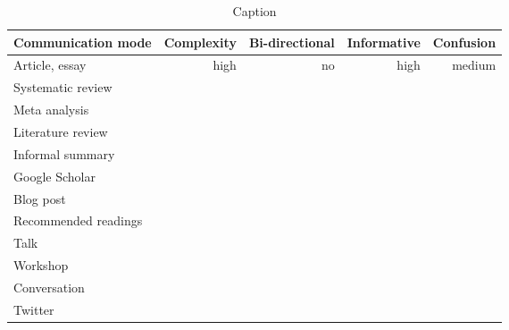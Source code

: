 \begin{table*}\centering
{}
\begin{tabular}{@{}lrrrr@{}}\toprule
Communication mode & Complexity & Bi-directional & Informative  & Confusion
\\\midrule
Article, essay & high & no & high & medium  \\
Systematic review \\
Meta analysis \\
Literature review \\
Informal summary \\
Google Scholar \\
Blog post \\
Recommended readings \\
Talk \\
Workshop \\
Conversation \\
Twitter


\bottomrule
\end{tabular}
\caption{Caption}
\end{table*}